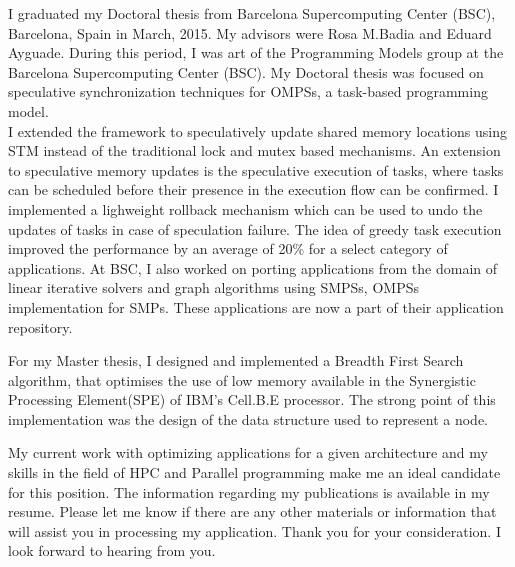\documentclass[10pt,stdletter,dateno]{newlfm}
\begin{document}
\begin{newlfm}
%
    \par
    I graduated my Doctoral thesis from Barcelona Supercomputing Center (BSC), Barcelona, Spain in March, 2015.
    My advisors were Rosa M.Badia and Eduard Ayguade.
    During this period, I was art of the Programming Models group at the Barcelona Supercomputing Center (BSC).
    My Doctoral thesis was focused on speculative synchronization techniques for OMPSs, a task-based programming model.\\
%
    I extended the framework to speculatively update shared memory locations using STM instead of the traditional lock and mutex based mechanisms.
    An extension to speculative memory updates is the speculative execution of tasks, where tasks can be scheduled before their presence in the execution flow can be confirmed.
    I implemented a lighweight rollback mechanism which can be used to undo the updates of tasks in case of speculation failure.
    The idea of greedy task execution improved the performance by an average of 20\% for a select category of applications.
    At BSC, I also worked on porting applications from the domain of linear iterative solvers and graph algorithms using SMPSs, OMPSs implementation for SMPs.
    These applications are now a part of their application repository.
%
    \par
    For my Master thesis, I designed and implemented a Breadth First Search algorithm, that optimises the use of low memory available in the Synergistic Processing Element(SPE) of IBM's Cell.B.E processor.
    The strong point of this implementation was the design of the data structure used to represent a node.
%
	\par
    My current work with optimizing applications for a given architecture and my skills in the field of HPC and Parallel programming make me an ideal candidate for this position.
    The information regarding my publications is available in my resume.
    Please let me know if there are any other materials or information that will assist you in processing my application.
    Thank you for your consideration. I look forward to hearing from you.


\end{newlfm}
\end{document}
